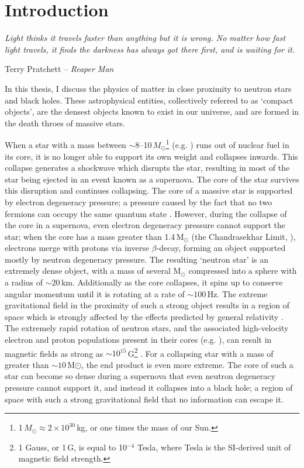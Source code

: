 \chapter{Introduction}

\epigraph{\textit{Light thinks it travels faster than anything but it is wrong. No matter how fast light travels, it finds the darkness has always got there first, and is waiting for it.}}{Terry Pratchett -- \textit{Reaper Man}}

\vspace{1cm}
\par\noindent In this thesis, I discuss the physics of matter in close proximity to neutron stars and black holes.  These astrophysical entities, collectively referred to as `compact objects', are the densest objects known to exist in our universe, and are formed in the death throes of massive stars.
\par When a star with a mass between $\sim8$--10\,$M_\odot$\footnote{1\,$M_\odot\approx2\times10^{30}$\,kg, or one times the mass of our Sun.} (e.g. \citealp{Bildsten_NS}) runs out of nuclear fuel in its core, it is no longer able to support its own weight and collapses inwards.  This collapse generates a shockwave which disrupts the star, resulting in most of the star being ejected in an event known as a supernova.  The core of the star survives this disruption and continues collapsing.  The core of a massive star is supported by electron degeneracy pressure; a pressure caused by the fact that no two fermions can occupy the same quantum state \citep{Pauli_Exclusion}.  However, during the collapse of the core in a supernova, even electron degeneracy pressure cannot support the star; when the core has a mass greater than 1.4\,M$_\odot$ (the Chandrasekhar Limit, \citealp{Chandrasekhar_Mass}), electrons merge with protons via inverse $\beta$-decay, forming an object supported mostly by neutron degeneracy pressure.  The resulting `neutron star' is an extremely dense object, with a mass of several M$_\odot$ compressed into a sphere with a radius of $\sim20$\,km.  Additionally as the core collapses, it spins up to conserve angular momentum until it is rotating at a rate of $\sim100$\,Hz.  The extreme gravitational field in the proximity of such a strong object results in a region of space which is strongly affected by the effects predicted by general relativity \citep{Einstein_GR}.  The extremely rapid rotation of neutron stars, and the associated high-velocity electron and proton populations present in their cores (e.g. \citealp{Alpar_Impure}), can result in magnetic fields as strong as $\sim10^{15}$\,G\footnote{1 Gauss, or 1\,G, is equal to 10$^{-4}$ Tesla, where Tesla is the SI-derived unit of magnetic field strength.} \citep{Woltjer_NSB,Gold_Pulsar,Kaspi_Magnetar}.  For a collapsing star with a mass of greater than $\sim10$\,M$\odot$, the end product is even more extreme.  The core of such a star can become so dense during a supernova that even neutron degeneracy pressure cannot support it, and instead it collapses into a black hole; a region of space with such a strong gravitational field that no information can escape it.
